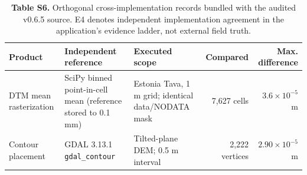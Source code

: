 \documentclass[11pt]{article}
\newcommand{\code}[1]{\texttt{#1}}
\begin{document}
\vspace{6mm}
\begin{table}[!htbp]
\centering
\caption*{\textbf{Table S6.} Orthogonal cross-implementation records bundled with the audited v0.6.5 source. E4 denotes independent implementation agreement in the application's evidence ladder, not external field truth.}
\vspace{2mm}
\small
\scriptsize
\setlength{\tabcolsep}{4pt}
\begin{tabularx}{\linewidth}{@{}l>{\raggedright\arraybackslash}X>{\raggedright\arraybackslash}Xrr@{}}
\toprule
Product & Independent reference & Executed scope & Compared & Max. difference \\
\midrule
DTM mean rasterization & SciPy binned point-in-cell mean (reference stored to 0.1 mm) & Estonia Tava, 1 m grid; identical data/NODATA mask & 7,627 cells & $3.6\times10^{-5}$ m \\
Contour placement & GDAL 3.13.1 \code{gdal\_contour} & Tilted-plane DEM; 0.5 m interval & 2,222 vertices & $2.90\times10^{-5}$ m \\
\bottomrule
\end{tabularx}
\end{table}
\end{document}
